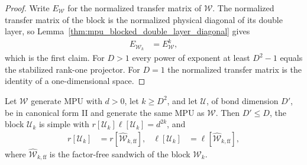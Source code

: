 \begin{proof}\leanok
    Write $E_{\mathcal W}$ for the normalized transfer matrix of
    $\mathcal W$. The normalized transfer matrix of the block is the
    normalized physical diagonal of its double layer, so
    Lemma~\ref{thm:mpu_blocked_double_layer_diagonal} gives
    \begin{align}
        E_{\mathcal W_k} & =E_{\mathcal W}^k,
        \label{eq:mpu_blocked_transfer_power}
    \end{align}
    which is the first claim. For $D>1$ every power of exponent at least $D^2-1$ equals the
    stabilized rank-one projector. For $D=1$ the normalized transfer matrix is
    the identity of a one-dimensional space.
\end{proof}

\begin{lemma}
    \label{lem:mpu_canonical_ranks_factor_free}
    \leanok
    Let $\mathcal W$ generate MPU with $d>0$, let $k\geq D^2$, and let
    $\mathcal U$, of bond dimension $D'$, be in canonical form II and generate
    the same MPU as $\mathcal W$. Then $D'\leq D$, the block $\mathcal U_k$ is
    simple with $r[\mathcal U_k]\ell[\mathcal U_k]=d^{2k}$, and
    \begin{align}
        r[\mathcal U_k]    & =r[\widehat{\mathcal W}_{k,\mathrm{ff}}],    &
        \ell[\mathcal U_k] & =\ell[\widehat{\mathcal W}_{k,\mathrm{ff}}],
    \end{align}
    where $\widehat{\mathcal W}_{k,\mathrm{ff}}$ is the factor-free sandwich
    of the block $\mathcal W_k$.
\end{lemma}

